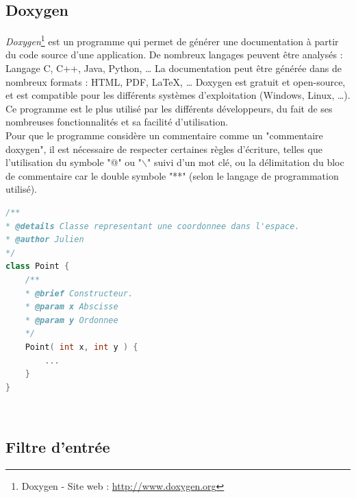 
\subsection{Doxygen}

\textit{Doxygen}\footnote{Doxygen - Site web : \href{http://www.doxygen.org}{http://www.doxygen.org}} est un programme qui permet de générer une documentation à partir du code source d'une application.
De nombreux langages peuvent être analysés : Langage C, C++, Java, Python, \ldots
La documentation peut être générée dans de nombreux formats : HTML, PDF, LaTeX, \ldots
Doxygen est gratuit et open-source, et est compatible pour les différents systèmes d'exploitation (Windows, Linux, \ldots).
Ce programme est le plus utilisé par les différents développeurs, du fait de ses nombreuses fonctionnalités et sa facilité d'utilisation.
\\


Pour que le programme considère un commentaire comme un "commentaire doxygen", il est nécessaire de respecter certaines règles d'écriture, telles que l'utilisation du symbole "@" ou "$\backslash$" suivi d'un mot clé, ou la délimitation du bloc de commentaire car le double symbole "**" (selon le langage de programmation utilisé).
\\


\begin{lstlisting}[language=C++]
/**
* @details Classe representant une coordonnee dans l'espace.
* @author Julien
*/
class Point {
    /**
    * @brief Constructeur.
    * @param x Abscisse
    * @param y Ordonnee
    */
    Point( int x, int y ) {
        ...
    }
}
\end{lstlisting}
~~\\





\subsection{Filtre d'entrée}

